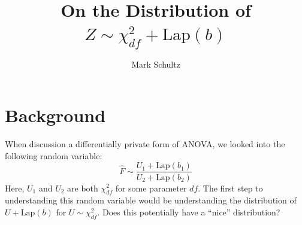 \documentclass{article}
\begin{document}
\title{On the Distribution of $Z\sim\chi^2_{df} + \text{Lap}(b)$}
\author{Mark Schultz}
\maketitle
\section{Background}
When discussion a differentially private form of ANOVA, we looked into the following random variable:
\begin{equation}
\widehat{F}\sim \frac{U_1+\text{Lap}(b_1)}{U_2+\text{Lap}(b_2)}
\end{equation}
Here, $U_1$ and $U_2$ are both $\chi^2_{df}$ for some parameter $df$.
The first step to understanding this random variable would be understanding the distribution of $U+\text{Lap}(b)$ for $U\sim\chi^2_{df}$.
Does this potentially have a ``nice'' distribution?
\end{document}
